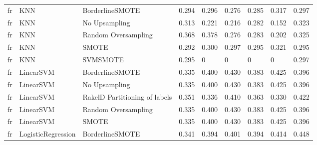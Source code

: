 \begin{tabular}{lllllllll}
      fr &                             KNN &               BorderlineSMOTE & 0.294 &                     0.296 &                 0.276 &                  0.285 &                                   0.317 &     0.297 \\
      fr &                             KNN &                 No Upsampling & 0.313 &                     0.221 &                 0.216 &                  0.282 &                                   0.152 &     0.323 \\
      fr &                             KNN &           Random Oversampling & 0.368 &                     0.378 &                 0.276 &                  0.283 &                                   0.202 &     0.325 \\
      fr &                             KNN &                         SMOTE & 0.292 &                     0.300 &                 0.297 &                  0.295 &                                   0.321 &     0.295 \\
      fr &                             KNN &                      SVMSMOTE & 0.295 &                         0 &                     0 &                      0 &                                       0 &     0.297 \\
      fr &                       LinearSVM &               BorderlineSMOTE & 0.335 &                     0.400 &                 0.430 &                  0.383 &                                   0.425 &     0.396 \\
      fr &                       LinearSVM &                 No Upsampling & 0.335 &                     0.400 &                 0.430 &                  0.383 &                                   0.425 &     0.396 \\
      fr &                       LinearSVM & RakelD Partitioning of labels & 0.351 &                     0.336 &                 0.410 &                  0.363 &                                   0.330 &     0.422 \\
      fr &                       LinearSVM &           Random Oversampling & 0.335 &                     0.400 &                 0.430 &                  0.383 &                                   0.425 &     0.396 \\
      fr &                       LinearSVM &                         SMOTE & 0.335 &                     0.400 &                 0.430 &                  0.383 &                                   0.425 &     0.396 \\
      fr &              LogisticRegression &               BorderlineSMOTE & 0.341 &                     0.394 &                 0.401 &                  0.394 &                                   0.414 &     0.448 \\

\end{tabular}
